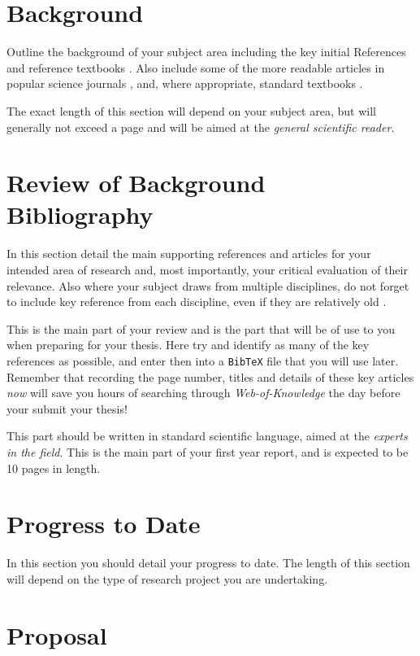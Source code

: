 \documentclass[a4paper,12pt]{article}
\begin{document}
\section{Background}

Outline the background of your subject area including the key initial
References \cite{jr:ashkin} and reference textbooks \cite{ob:bornwolf}. 
Also include some of the more
readable articles in popular science journals \cite{jr:dholakia},
and, where appropriate, standard textbooks \cite{ob:hechtoptics}.

The exact length of this section will depend on your subject area,
but will generally not exceed a page and will be aimed at the 
{\it general scientific reader}. 

\section{Review of Background Bibliography}

In this section detail the main supporting references
and articles \cite{jr:block} for your intended area of research
and, most importantly, your critical evaluation of their
relevance.  Also where your subject draws from multiple 
disciplines, do not forget to include key reference from
each discipline, even if they are relatively old \cite{jr:dammann}. 


This is the main part of your review and is the part that
will be of use to you when preparing for your thesis. Here try
and identify as many of the key references as possible, and enter then
into a {\tt BibTeX} file that you will use later. Remember that recording
the page number, titles and details of these 
key articles {\it now} will save you hours of
searching through {\em Web-of-Knowledge} the day before your
submit your thesis!

This part should be written in standard scientific language, 
aimed at the {\em experts in the field}. This is the main part of your first year report, and is 
expected to be 10 pages in length.

\section{Progress to Date}

In this section you should detail your progress to date. The length of this section
will depend on the type of research project you are undertaking.  

\section{Proposal}
\end{document}
